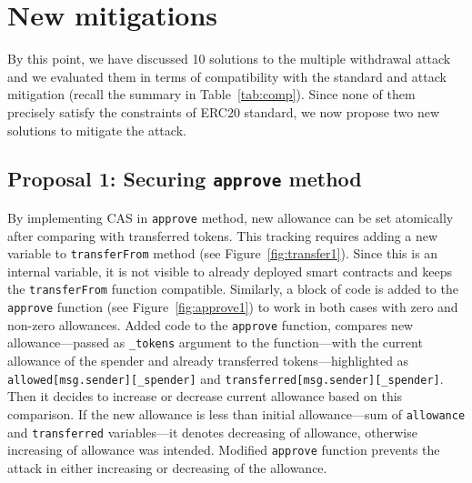 
\section{New mitigations}

By this point, we have discussed 10 solutions to the multiple withdrawal attack and we evaluated them in terms of compatibility with the standard and attack mitigation (recall the summary in Table~\ref{tab:comp}). Since none of them precisely satisfy the constraints of ERC20 standard, we now propose two new solutions to mitigate the attack.

\subsection{Proposal 1: Securing \texttt{approve} method}\label{sec:proposal1}


By implementing CAS \cite{Ref06} in \texttt{approve} method, new allowance can be set atomically after comparing with transferred tokens. This tracking requires adding a new variable to \texttt{transferFrom} method (see Figure~\ref{fig:transfer1}). Since this is an internal variable, it is not visible to already deployed smart contracts and keeps the \texttt{transferFrom} function compatible. Similarly, a block of code is added to the \texttt{approve} function (see Figure~\ref{fig:approve1}) to work in both cases with zero and non-zero allowances. Added code to the \texttt{approve} function, compares new allowance---passed as \texttt{\_tokens} argument to the function---with the current allowance of the spender and already transferred tokens---highlighted as \texttt{allowed[msg.sender][\_spender]} and \texttt{transferred[msg.sender][\_spender]}. Then it decides to increase or decrease current allowance based on this comparison. If the new allowance is less than initial allowance---sum of \texttt{allowance} and \texttt{transferred} variables---it denotes decreasing of allowance, otherwise increasing of allowance was intended. Modified \texttt{approve} function prevents the attack in either increasing or decreasing of the allowance.

